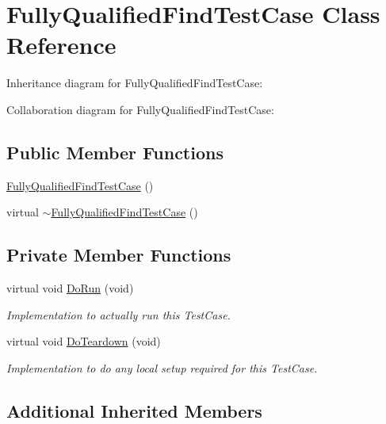 \hypertarget{classFullyQualifiedFindTestCase}{}\section{Fully\+Qualified\+Find\+Test\+Case Class Reference}
\label{classFullyQualifiedFindTestCase}


Inheritance diagram for Fully\+Qualified\+Find\+Test\+Case\+:


Collaboration diagram for Fully\+Qualified\+Find\+Test\+Case\+:
\subsection*{Public Member Functions}
\begin{DoxyCompactItemize}
\item 
\hyperlink{classFullyQualifiedFindTestCase_ad2ee645e75c06b7d4d8aa58a073ae7d8}{Fully\+Qualified\+Find\+Test\+Case} ()
\item 
virtual \hyperlink{classFullyQualifiedFindTestCase_a83ea0d1a032a68d99e3fb0ecf9a360b1}{$\sim$\+Fully\+Qualified\+Find\+Test\+Case} ()
\end{DoxyCompactItemize}
\subsection*{Private Member Functions}
\begin{DoxyCompactItemize}
\item 
virtual void \hyperlink{classFullyQualifiedFindTestCase_a71d0588235f8deb6971449075ff49200}{Do\+Run} (void)
\begin{DoxyCompactList}\small\item\em Implementation to actually run this Test\+Case. \end{DoxyCompactList}\item 
virtual void \hyperlink{classFullyQualifiedFindTestCase_a3c996c5de4fa2e1419fccb0a8507f894}{Do\+Teardown} (void)
\begin{DoxyCompactList}\small\item\em Implementation to do any local setup required for this Test\+Case. \end{DoxyCompactList}\end{DoxyCompactItemize}
\subsection*{Additional Inherited Members}


